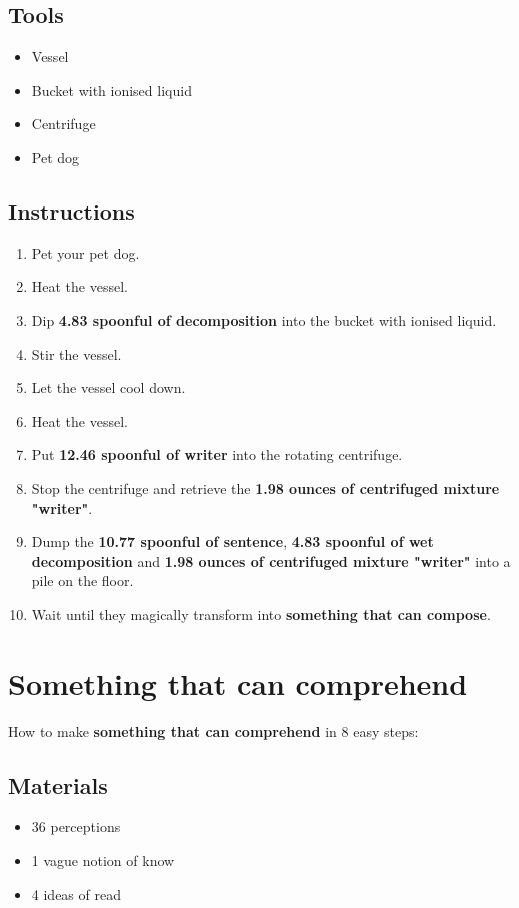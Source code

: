 \documentclass{article}
\begin{document}
\subsection{Tools}\begin{itemize}
\item 
Vessel
\item 
Bucket with ionised liquid
\item 
Centrifuge
\item 
Pet dog
\end{itemize}
\subsection{Instructions}\begin{enumerate}
\item 
Pet your pet dog.
\item 
Heat the vessel.
\item 
Dip \textbf{4.83 spoonful of decomposition} into the bucket with ionised liquid.
\item 
Stir the vessel.
\item 
Let the vessel cool down.
\item 
Heat the vessel.
\item 
Put \textbf{12.46 spoonful of writer} into the rotating centrifuge.
\item 
Stop the centrifuge and retrieve the \textbf{1.98 ounces of centrifuged mixture "writer"}.
\item 
Dump the \textbf{10.77 spoonful of sentence}, \textbf{4.83 spoonful of wet decomposition} and \textbf{1.98 ounces of centrifuged mixture "writer"} into a pile on the floor.
\item 
Wait until they magically transform into \textbf{something that can compose}.
\end{enumerate}
\newpage
\section{Something that can comprehend}How to make \textbf{something that can comprehend} in 8 easy steps:

\subsection{Materials}\begin{itemize}
\item 
36 perceptions
\item 
1 vague notion of know
\item 
4 ideas of read
\end{itemize}
\end{document}
